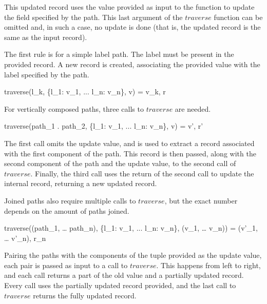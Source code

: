 \documentclass{article}
\begin{document}
This updated record uses the value provided as input to the function to update the field specified by the path.
This last argument of the $traverse$ function can be omitted and, in such a case, no update is done (that is, the updated record is the same as the input record).

\medskip

The first rule is for a simple label path.
The label must be present in the provided record.
A new record is created, associating the provided value with the label specified by the path.

    {traverse(l_k, \{l_1: v_1, ... l_n: v_n\}, v) = v_k, r}

For vertically composed paths, three calls to $traverse$ are needed.

    {traverse(path_1 \; . \; path_2, \{l_1: v_1, ... l_n: v_n\}, v) = v', r'}

The first call omits the update value, and is used to extract a record associated with the first component of the path.
This record is then passed, along with the second component of the path and the update value, to the second call of $traverse$.
Finally, the third call uses the return of the second call to update the internal record, returning a new updated record.

\bigskip

Joined paths also require multiple calls to $traverse$, but the exact number depends on the amount of paths joined.

    {traverse((path_1, \; \dots \; path_n), \{l_1: v_1, ... l_n: v_n\}, (v_1, \; \dots \; v_n)) = (v'_1, \; \dots \; v'_n), r_n}

Pairing the paths with the components of the tuple provided as the update value, each pair is passed as input to a call to $traverse$.
This happens from left to right, and each call returns a part of the old value and a partially updated record.
Every call uses the partially updated record provided, and the last call to $traverse$ returns the fully updated record.
\end{document}
